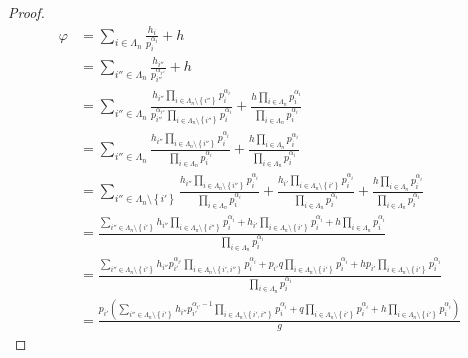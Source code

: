 \documentclass[dvipdfmx]{jsarticle}
\begin{document}
\begin{proof}
\begin{align*}
\varphi &= \sum_{i \in \varLambda_{n}} \frac{h_{i}}{p_{i}^{\alpha_{i}}} + h\\
&= \sum_{i'' \in \varLambda_{n}} \frac{h_{i''}}{p_{i''}^{\alpha_{i''}}} + h\\
&= \sum_{i'' \in \varLambda_{n}} \frac{h_{i''}\prod_{i \in \varLambda_{n} \setminus \left\{ i'' \right\}} p_{i}^{\alpha_{i}}}{p_{i''}^{\alpha_{i''}}\prod_{i \in \varLambda_{n} \setminus \left\{ i'' \right\}} p_{i}^{\alpha_{i}}} + \frac{h\prod_{i \in \varLambda_{n}} p_{i}^{\alpha_{i}}}{\prod_{i \in \varLambda_{n}} p_{i}^{\alpha_{i}}}\\
&= \sum_{i'' \in \varLambda_{n}} \frac{h_{i''}\prod_{i \in \varLambda_{n} \setminus \left\{ i'' \right\}} p_{i}^{\alpha_{i}}}{\prod_{i \in \varLambda_{n}} p_{i}^{\alpha_{i}}} + \frac{h\prod_{i \in \varLambda_{n}} p_{i}^{\alpha_{i}}}{\prod_{i \in \varLambda_{n}} p_{i}^{\alpha_{i}}}\\
&= \sum_{i'' \in \varLambda_{n} \setminus \left\{ i' \right\}} \frac{h_{i''}\prod_{i \in \varLambda_{n} \setminus \left\{ i'' \right\}} p_{i}^{\alpha_{i}}}{\prod_{i \in \varLambda_{n}} p_{i}^{\alpha_{i}}} + \frac{h_{i'}\prod_{i \in \varLambda_{n} \setminus \left\{ i' \right\}} p_{i}^{\alpha_{i}}}{\prod_{i \in \varLambda_{n}} p_{i}^{\alpha_{i}}} + \frac{h\prod_{i \in \varLambda_{n}} p_{i}^{\alpha_{i}}}{\prod_{i \in \varLambda_{n}} p_{i}^{\alpha_{i}}}\\
&= \frac{\sum_{i'' \in \varLambda_{n} \setminus \left\{ i' \right\}} {h_{i''}\prod_{i \in \varLambda_{n} \setminus \left\{ i'' \right\}} p_{i}^{\alpha_{i}}} + h_{i'}\prod_{i \in \varLambda_{n} \setminus \left\{ i' \right\}} p_{i}^{\alpha_{i}} + h\prod_{i \in \varLambda_{n}} p_{i}^{\alpha_{i}}}{\prod_{i \in \varLambda_{n}} p_{i}^{\alpha_{i}}}\\
&= \frac{\sum_{i'' \in \varLambda_{n} \setminus \left\{ i' \right\}} {h_{i''}p_{i'}^{\alpha_{i'}}\prod_{i \in \varLambda_{n} \setminus \left\{ i',i'' \right\}} p_{i}^{\alpha_{i}}} + p_{i'}q\prod_{i \in \varLambda_{n} \setminus \left\{ i' \right\}} p_{i}^{\alpha_{i}} + hp_{i'}\prod_{i \in \varLambda_{n} \setminus \left\{ i' \right\}} p_{i}^{\alpha_{i}}}{\prod_{i \in \varLambda_{n}} p_{i}^{\alpha_{i}}}\\
&= \frac{p_{i'}\left( \sum_{i'' \in \varLambda_{n} \setminus \left\{ i' \right\}} {h_{i''}p_{i'}^{\alpha_{i'} - 1}\prod_{i \in \varLambda_{n} \setminus \left\{ i',i'' \right\}} p_{i}^{\alpha_{i}}} + q\prod_{i \in \varLambda_{n} \setminus \left\{ i' \right\}} p_{i}^{\alpha_{i}} + h\prod_{i \in \varLambda_{n} \setminus \left\{ i' \right\}} p_{i}^{\alpha_{i}} \right)}{g}

\end{align*}
\end{proof}
\end{document}
